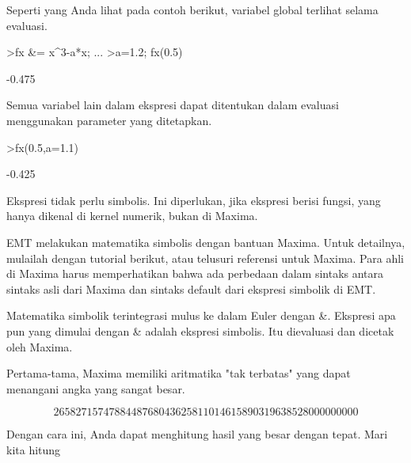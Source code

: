 \documentclass{article}
\begin{document}
\begin{eulernotebook}
\begin{eulercomment}
\begin{eulercomment}
\begin{eulercomment}
Seperti yang Anda lihat pada contoh berikut, variabel global terlihat
selama evaluasi.
\end{eulercomment}
\begin{eulerprompt}
>fx &= x^3-a*x;  ...
>a=1.2; fx(0.5)
\end{eulerprompt}
\begin{euleroutput}
  -0.475
\end{euleroutput}
\begin{eulercomment}
Semua variabel lain dalam ekspresi dapat ditentukan dalam evaluasi
menggunakan parameter yang ditetapkan.
\end{eulercomment}
\begin{eulerprompt}
>fx(0.5,a=1.1)
\end{eulerprompt}
\begin{euleroutput}
  -0.425
\end{euleroutput}
\begin{eulercomment}
Ekspresi tidak perlu simbolis. Ini diperlukan, jika ekspresi berisi
fungsi, yang hanya dikenal di kernel numerik, bukan di Maxima.

\begin{eulercomment}
\begin{eulercomment}
EMT melakukan matematika simbolis dengan bantuan Maxima. Untuk
detailnya, mulailah dengan tutorial berikut, atau telusuri referensi
untuk Maxima. Para ahli di Maxima harus memperhatikan bahwa ada
perbedaan dalam sintaks antara sintaks asli dari Maxima dan sintaks
default dari ekspresi simbolik di EMT.

Matematika simbolik terintegrasi mulus ke dalam Euler dengan \&.
Ekspresi apa pun yang dimulai dengan \& adalah ekspresi simbolis. Itu
dievaluasi dan dicetak oleh Maxima.

Pertama-tama, Maxima memiliki aritmatika "tak terbatas" yang dapat
menangani angka yang sangat besar.
\end{eulercomment}
\begin{eulerformula}
\[
2658271574788448768043625811014615890319638528000000000
\]
\end{eulerformula}
\begin{eulercomment}
Dengan cara ini, Anda dapat menghitung hasil yang besar dengan tepat.
Mari kita hitung


\end{eulercomment}
\end{eulercomment}
\end{eulercomment}
\end{eulercomment}
\end{eulercomment}
\end{eulernotebook}
\end{document}
